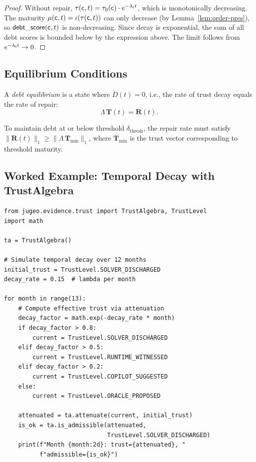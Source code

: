\documentclass[11pt]{article}
\newcommand{\DebtScore}{\mathsf{debt\_score}}
\newcommand{\DebtThreshold}{\delta_{\mathrm{thresh}}}
\begin{document}
\begin{proof}
Without repair, $\tau(\mathsf{c}, t) = \tau_0(\mathsf{c}) \cdot
e^{-\lambda_{\mathsf{c}} t}$, which is monotonically decreasing.
The maturity $\mu(\mathsf{c}, t) = \iota(\tau(\mathsf{c}, t))$ can only
decrease (by Lemma~\ref{lem:order-pres}), so
$\DebtScore(\coord, t)$ is non-decreasing.  Since decay is
exponential, the sum of all debt scores is bounded below by the
expression above.  The limit follows from $e^{-\lambda_{\mathsf{c}} t}
\to 0$.
\end{proof}

\subsection{Equilibrium Conditions}\label{subsec:equilibrium}

\begin{definition}\label{def:equilibrium}
A \emph{debt equilibrium} is a state where $\dot{D}(t) = 0$, i.e.,
the rate of trust decay equals the rate of repair:
\[
  \Lambda \, \mathbf{T}(t) = \mathbf{R}(t).
\]
\end{definition}

\begin{corollary}\label{cor:min-repair}
To maintain debt at or below threshold $\DebtThreshold$, the repair
rate must satisfy $\|\mathbf{R}(t)\|_1 \geq
\|\Lambda \, \mathbf{T}_{\min}\|_1$, where $\mathbf{T}_{\min}$ is
the trust vector corresponding to threshold maturity.
\end{corollary}

\subsection{Worked Example: Temporal Decay with TrustAlgebra}%
\label{subsec:temporal-example}

\begin{lstlisting}[style=jugeo-python]
from jugeo.evidence.trust import TrustAlgebra, TrustLevel
import math

ta = TrustAlgebra()

# Simulate temporal decay over 12 months
initial_trust = TrustLevel.SOLVER_DISCHARGED
decay_rate = 0.15  # lambda per month

for month in range(13):
    # Compute effective trust via attenuation
    decay_factor = math.exp(-decay_rate * month)
    if decay_factor > 0.8:
        current = TrustLevel.SOLVER_DISCHARGED
    elif decay_factor > 0.5:
        current = TrustLevel.RUNTIME_WITNESSED
    elif decay_factor > 0.2:
        current = TrustLevel.COPILOT_SUGGESTED
    else:
        current = TrustLevel.ORACLE_PROPOSED

    attenuated = ta.attenuate(current, initial_trust)
    is_ok = ta.is_admissible(attenuated,
                             TrustLevel.SOLVER_DISCHARGED)
    print(f"Month {month:2d}: trust={attenuated}, "
          f"admissible={is_ok}")
\end{lstlisting}
\end{document}

